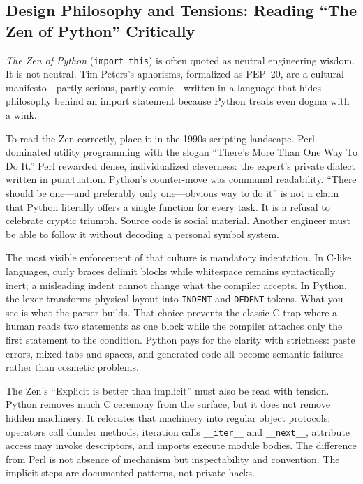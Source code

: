 \subsection{Design Philosophy and Tensions: Reading “The Zen of Python” Critically}

\emph{The Zen of Python} (\texttt{import this}) is often quoted as neutral engineering wisdom. It is not neutral. Tim Peters's aphorisms, formalized as PEP~20, are a cultural manifesto---partly serious, partly comic---written in a language that hides philosophy behind an import statement because Python treats even dogma with a wink.

To read the Zen correctly, place it in the 1990s scripting landscape. Perl dominated utility programming with the slogan ``There's More Than One Way To Do It.'' Perl rewarded dense, individualized cleverness: the expert's private dialect written in punctuation. Python's counter-move was communal readability. ``There should be one---and preferably only one---obvious way to do it'' is not a claim that Python literally offers a single function for every task. It is a refusal to celebrate cryptic triumph. Source code is social material. Another engineer must be able to follow it without decoding a personal symbol system.

The most visible enforcement of that culture is mandatory indentation. In C-like languages, curly braces delimit blocks while whitespace remains syntactically inert; a misleading indent cannot change what the compiler accepts. In Python, the lexer transforms physical layout into \texttt{INDENT} and \texttt{DEDENT} tokens. What you see is what the parser builds. That choice prevents the classic C trap where a human reads two statements as one block while the compiler attaches only the first statement to the condition. Python pays for the clarity with strictness: paste errors, mixed tabs and spaces, and generated code all become semantic failures rather than cosmetic problems.

The Zen's ``Explicit is better than implicit'' must also be read with tension. Python removes much C ceremony from the surface, but it does not remove hidden machinery. It relocates that machinery into regular object protocols: operators call dunder methods, iteration calls \texttt{\_\_iter\_\_} and \texttt{\_\_next\_\_}, attribute access may invoke descriptors, and imports execute module bodies. The difference from Perl is not absence of mechanism but inspectability and convention. The implicit steps are documented patterns, not private hacks.

